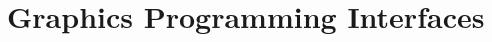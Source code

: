 \chapter{Graphics Programming Interfaces}\label{ch:graphics_programming_interfaces}
\begin{chaptermeta}
\end{chaptermeta}




